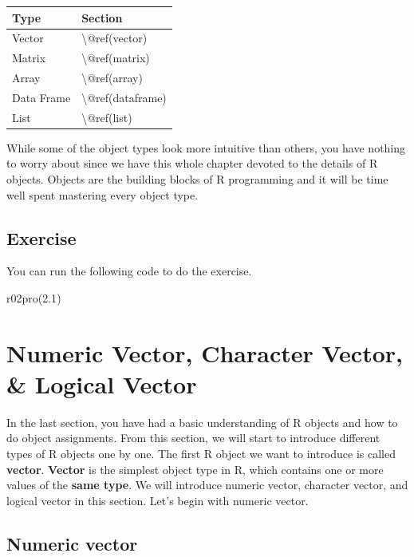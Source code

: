 \documentclass[
]{book}
\newenvironment{Shaded}{\begin{snugshade}}{\end{snugshade}}
\newcommand{\FloatTok}[1]{\textcolor[rgb]{0.00,0.00,0.81}{#1}}
\newcommand{\FunctionTok}[1]{\textcolor[rgb]{0.00,0.00,0.00}{#1}}
\newcommand{\NormalTok}[1]{#1}
\begin{document}
\begin{tabular}{l|l}
\hline
Type & Section\\
\hline
Vector & \textbackslash{}@ref(vector)\\
\hline
Matrix & \textbackslash{}@ref(matrix)\\
\hline
Array & \textbackslash{}@ref(array)\\
\hline
Data Frame & \textbackslash{}@ref(dataframe)\\
\hline
List & \textbackslash{}@ref(list)\\
\hline
\end{tabular}

While some of the object types look more intuitive than others, you have nothing to worry about since we have this whole chapter devoted to the details of R objects. Objects are the building blocks of R programming and it will be time well spent mastering every object type.

\hypertarget{exercise-1}{%
\subsection{Exercise}\label{exercise-1}}

You can run the following code to do the exercise.

\begin{Shaded}
\begin{Highlighting}[]
\FunctionTok{r02pro}\NormalTok{(}\FloatTok{2.1}\NormalTok{)}
\end{Highlighting}
\end{Shaded}

\hypertarget{vector}{%
\section{Numeric Vector, Character Vector, \& Logical Vector}\label{vector}}

In the last section, you have had a basic understanding of R objects and how to do object assignments. From this section, we will start to introduce different types of R objects one by one. The first R object we want to introduce is called \textbf{vector}. \textbf{Vector} is the simplest object type in R, which contains one or more values of the \textbf{same type}. We will introduce numeric vector, character vector, and logical vector in this section. Let's begin with numeric vector.

\hypertarget{numeric-vector}{%
\subsection{Numeric vector}\label{numeric-vector}}
\end{document}
